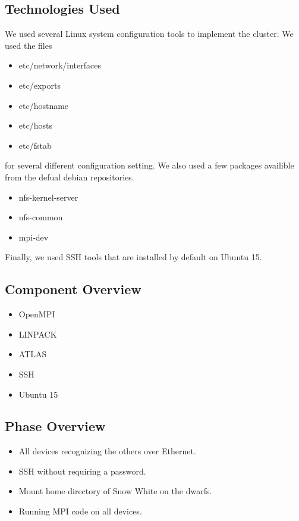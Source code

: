 \subsection{Technologies  Used}
We used several Linux system configuration tools to implement the cluster. We used the files
\begin{itemize}
	\item etc/network/interfaces
	\item etc/exports
	\item etc/hostname
	\item etc/hosts
	\item etc/fstab
\end{itemize}
for several different configuration setting. We also used a few packages availible from the defual debian repositories.
\begin{itemize}
	\item nfs-kernel-server
	\item nfs-common
	\item mpi-dev
\end{itemize}

Finally, we used SSH tools that are installed by default on Ubuntu 15.

\subsection{Component  Overview}
\begin{itemize}
	\item OpenMPI
	\item LINPACK
	\item ATLAS
	\item SSH
	\item Ubuntu 15
\end{itemize}

\subsection{Phase Overview}

\begin{itemize} 
	\item All devices recognizing the others over Ethernet.
	\item SSH without requiring a password.
	\item Mount home directory of Snow White on the dwarfs.
	\item Running MPI code on all devices.
\end{itemize}

